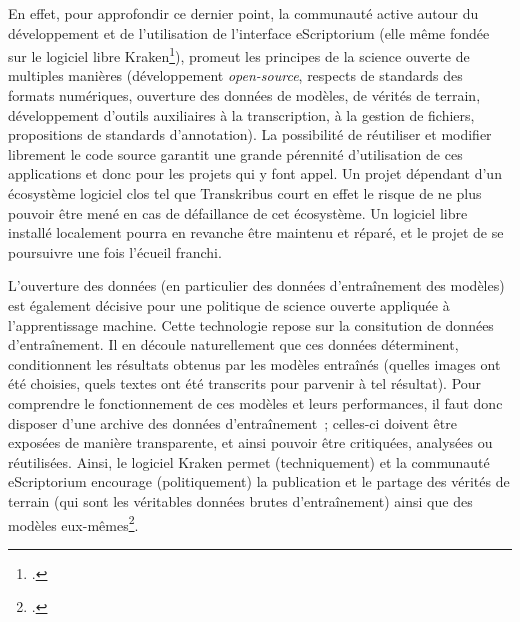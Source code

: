 \documentclass[a4paper,12pt,twoside]{book}
\begin{document}
			En effet, pour approfondir ce dernier point, la communauté active autour du développement et de l'utilisation de l'interface eScriptorium (elle même fondée sur le logiciel libre Kraken\footcite{KrakenDocumentation}), promeut les principes de la science ouverte de multiples manières (développement \textit{open-source}, respects de standards des formats numériques, ouverture des données de modèles, de vérités de terrain, développement d'outils auxiliaires à la transcription, à la gestion de fichiers, propositions de standards d'annotation). La possibilité de réutiliser et modifier librement le code source garantit une grande pérennité d'utilisation de ces applications et donc pour les projets qui y font appel. Un projet dépendant d'un écosystème logiciel clos tel que Transkribus court en effet le risque de ne plus pouvoir être mené en cas de défaillance de cet écosystème. Un logiciel libre installé localement pourra en revanche être maintenu et réparé, et le projet de se poursuivre une fois l'écueil franchi.
			
			L'ouverture des données (en particulier des données d'entraînement des modèles) est également décisive pour une politique de science ouverte appliquée à l'apprentissage machine. Cette technologie repose sur la consitution de données d'entraînement. Il en découle naturellement que ces données déterminent, conditionnent les résultats obtenus par les modèles entraînés (quelles images ont été choisies, quels textes ont été transcrits pour parvenir à tel résultat). Pour comprendre le fonctionnement de ces modèles et leurs performances, il faut donc disposer d'une archive des données d'entraînement~; celles-ci doivent être exposées de manière transparente, et ainsi pouvoir être critiquées, analysées ou réutilisées. Ainsi, le logiciel Kraken permet (techniquement) et la communauté eScriptorium encourage (politiquement) la publication et le partage des vérités de terrain (qui sont les véritables données brutes d'entraînement) ainsi que des modèles eux-mêmes\footcite{chagueHTRUnitedMutualisonsVerite2021}.
			
\end{document}
